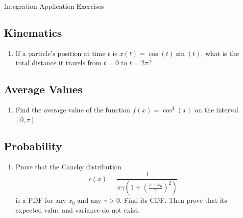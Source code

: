 \documentclass{article}
\begin{document}
\begin{center}
\begin{Huge}Integration Application Exercises\end{Huge}
\end{center}


\subsection{Kinematics}
\begin{enumerate}
\item If a particle's position at time $t$ is $x(t)=\cos(t)\sin(t)$, what is the total distance it travels from $t=0$ to $t=2\pi$?
\end{enumerate}


\subsection{Average Values}
\begin{enumerate}
\item Find the average value of the function $f(x) = \cos^3(x)$ on the interval $[0,\pi]$.

\end{enumerate}

\subsection{Probability}

\begin{enumerate}
\item Prove that the Cauchy distribution 
$$c(x)=\frac{1}{\pi\gamma\left(1+\left(\frac{x-x_0}{\gamma}\right)^2\right)}$$
is a PDF for any $x_0$ and any $\gamma>0$. Find its CDF. Then prove that its expected value and variance do not exist.
\end{enumerate}
\end{document}
